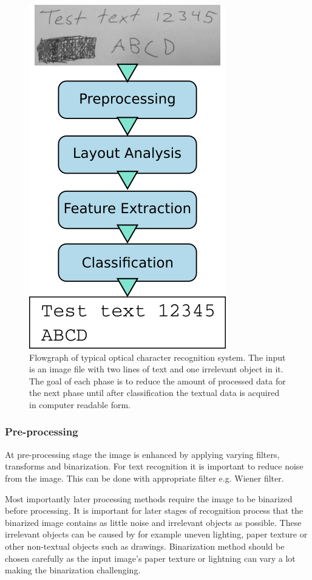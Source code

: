\documentclass{article}
\begin{document}
    \begin{figure}[!ht]
      \centering
      \includegraphics[natwidth=324,natheight=566,scale=0.4]{flowgraph.png}
      \caption{Flowgraph of typical optical character recognition system. The input is an image file with two lines of text and one irrelevant object in it. The goal of each phase is to reduce the amount of processed data for the next phase until after classification the textual data is acquired in computer readable form. \label{fig:flow} }
    \end{figure}

      \subsubsection{Pre-processing}
        At pre-processing stage the image is enhanced by applying varying filters, transforms and binarization. For text recognition it is important to reduce noise from the image. This can be done with appropriate filter e.g. Wiener filter.

        Most  importantly later processing methods require the image to be binarized before processing. It is important for later stages of recognition process that the binarized image contains as little noise and irrelevant objects as possible.  These irrelevant objects can be caused by for example uneven lighting, paper texture or other non-textual objects such as drawings. Binarization method should be chosen carefully as the input image's paper texture or lightning can vary a lot making the binarization challenging.
\end{document}
